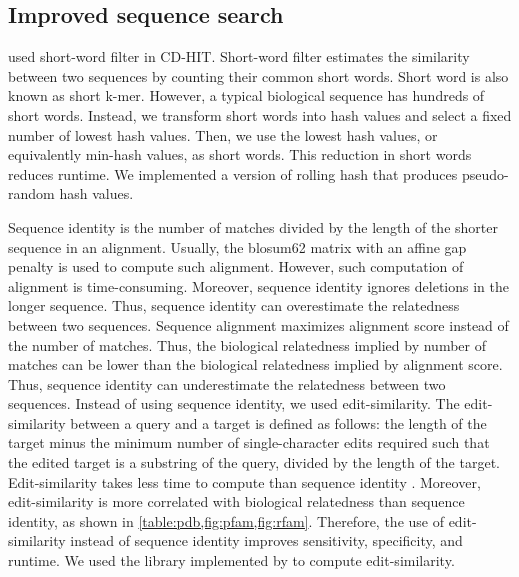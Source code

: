 \documentclass[11pt,letterpaper]{article}
\begin{document}
\subsection{Improved sequence search}

 used short-word filter in CD-HIT.
Short-word filter estimates the similarity between two sequences by counting their common short words.
Short word is also known as short k-mer.
However, a typical biological sequence has hundreds of short words.
Instead, we transform short words into hash values and select a fixed number of lowest hash values.
Then, we use the lowest hash values, or equivalently min-hash values, as short words.
This reduction in short words reduces runtime.
We implemented a version of rolling hash that produces pseudo-random hash values.

Sequence identity is the number of matches divided by the length of the shorter sequence in an alignment.
Usually, the blosum62 matrix with an affine gap penalty is used to compute such alignment.
However, such computation of alignment is time-consuming.
Moreover, sequence identity ignores deletions in the longer sequence.
Thus, sequence identity can overestimate the relatedness between two sequences.
Sequence alignment maximizes alignment score instead of the number of matches.
Thus, the biological relatedness implied by number of matches can be lower than the biological relatedness implied by alignment score.
Thus, sequence identity can underestimate the relatedness between two sequences.
Instead of using sequence identity, we used edit-similarity.
The edit-similarity between a query and a target is defined as follows: 
	the length of the target minus the minimum number of single-character edits required such that the edited target is a substring of the query, divided by the length of the target.
Edit-similarity takes less time to compute than sequence identity \citep{vsovsic2017edlib}.
Moreover, edit-similarity is more correlated with biological relatedness than sequence identity, as shown in \cref{table:pdb,fig:pfam,fig:rfam}.
Therefore, the use of edit-similarity instead of sequence identity improves sensitivity, specificity, and runtime.
We used the library implemented by \citet{vsovsic2017edlib} to compute edit-similarity.
\end{document}
